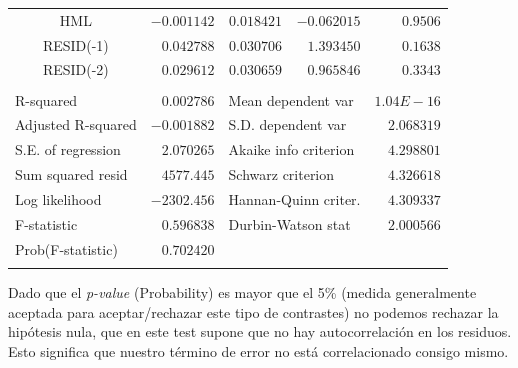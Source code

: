 \documentclass[12pt]{article}
\numberwithin{equation}{section} %
\begin{document}
\begin{table}[H]
\begin{tabular}{lrrrr}
\multicolumn{1}{c}{HML}&\multicolumn{1}{r}{$-0.001142$}&\multicolumn{1}{r}{$0.018421$}&\multicolumn{1}{r}{$-0.062015$}&\multicolumn{1}{r}{$0.9506$}\\
\multicolumn{1}{c}{RESID(-1)}&\multicolumn{1}{r}{$0.042788$}&\multicolumn{1}{r}{$0.030706$}&\multicolumn{1}{r}{$1.393450$}&\multicolumn{1}{r}{$0.1638$}\\
\multicolumn{1}{c}{RESID(-2)}&\multicolumn{1}{r}{$0.029612$}&\multicolumn{1}{r}{$0.030659$}&\multicolumn{1}{r}{$0.965846$}&\multicolumn{1}{r}{$0.3343$}\\
[4.5pt] \hline \\ [-4.5pt]
\multicolumn{1}{l}{R-squared}&\multicolumn{1}{r}{$0.002786$}&\multicolumn{2}{l}{Mean dependent var}&\multicolumn{1}{r}{$1.04E-16$}\\
\multicolumn{1}{l}{Adjusted R-squared}&\multicolumn{1}{r}{$-0.001882$}&\multicolumn{2}{l}{S.D. dependent var}&\multicolumn{1}{r}{$2.068319$}\\
\multicolumn{1}{l}{S.E. of regression}&\multicolumn{1}{r}{$2.070265$}&\multicolumn{2}{l}{Akaike info criterion}&\multicolumn{1}{r}{$4.298801$}\\
\multicolumn{1}{l}{Sum squared resid}&\multicolumn{1}{r}{$4577.445$}&\multicolumn{2}{l}{Schwarz criterion}&\multicolumn{1}{r}{$4.326618$}\\
\multicolumn{1}{l}{Log likelihood}&\multicolumn{1}{r}{$-2302.456$}&\multicolumn{2}{l}{Hannan-Quinn criter.}&\multicolumn{1}{r}{$4.309337$}\\
\multicolumn{1}{l}{F-statistic}&\multicolumn{1}{r}{$0.596838$}&\multicolumn{2}{l}{Durbin-Watson stat}&\multicolumn{1}{r}{$2.000566$}\\
\multicolumn{1}{l}{Prob(F-statistic)}&\multicolumn{1}{r}{$0.702420$}&\multicolumn{1}{c}{}&\multicolumn{1}{c}{}&\multicolumn{1}{c}{}\\
[4.5pt] \hline \\ [-4.5pt]
\end{tabular}
\end{table}

Dado que el \textit{p-value} (Probability) es mayor que el 5\% (medida generalmente aceptada para aceptar/rechazar este tipo de contrastes) no podemos rechazar la hipótesis nula, que en este test supone que no hay autocorrelación en los residuos. Esto significa que nuestro término de error no está correlacionado consigo mismo.
\end{document}
